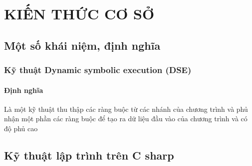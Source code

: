 \newpage
\chapter{KIẾN THỨC CƠ SỞ}

\section{Một số khái niệm, định nghĩa}
\subsection{Kỹ thuật Dynamic symbolic execution (DSE) }
\subsubsection{Định nghĩa}
Là một kỹ thuật thu thập các ràng buộc từ các nhánh của chương trình và phủ nhận một phần các ràng buộc để tạo ra dữ liệu đầu vào của chương trình và có độ phủ cao


\section{Kỹ thuật lập trình trên C sharp}


	
